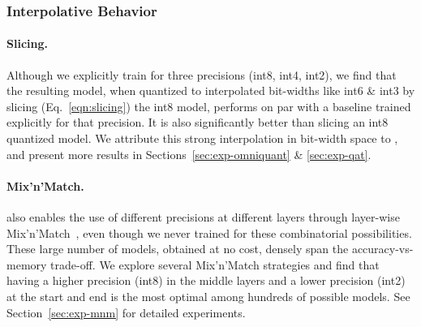 
\subsubsection{Interpolative Behavior}
\label{sec:interpolate}

\paragraph{Slicing.}
Although we explicitly train \alg for three precisions (int8, int4, int2), we find that the resulting model, when quantized to interpolated bit-widths like int6 \& int3 by slicing (Eq.~\ref{eqn:slicing}) the int8 model, performs on par with a baseline trained explicitly for that precision. It is also significantly better than slicing an int8 quantized model. We attribute this strong interpolation in bit-width space to \alg, and present more results in Sections~\ref{sec:exp-omniquant} \& \ref{sec:exp-qat}.

\vspace{-4mm}
\paragraph{Mix'n'Match.}
\alg also enables the use of different precisions at different layers through layer-wise Mix'n'Match~\citep{devvrit2023matformer}, even though we never trained for these combinatorial possibilities. These large number of models, obtained at no cost, densely span the accuracy-vs-memory trade-off. We explore several Mix'n'Match strategies and find that having a higher precision (int8) in the middle layers and a lower precision (int2) at the start and end is the most optimal among hundreds of possible models. See Section~\ref{sec:exp-mnm} for detailed experiments.


